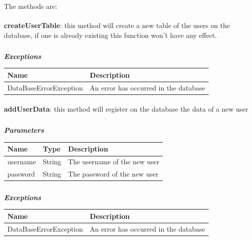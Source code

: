 						The methods are:
						
						\paragraph{}
							\textbf{createUserTable}: this method will create a new table of the users on the database, if one is already existing this function won't have any effect.
							\subparagraph{}
								\textit{\textbf{Exceptions}}
									\begin{table}[!h]
									\begin{tabular}{L{0.3\textwidth}L{0.3\textwidth}}
										\toprule
										Name & Description \\
										\midrule
								  		DataBaseErrorException & An error has occurred in the database \\ 
								 		\bottomrule
									\end{tabular}
								\end{table}
					
					\paragraph{}
							\textbf{addUserData}: this method will register on the database the data of a new user
							\subparagraph{}
							\textit{\textbf{Parameters}}
								\begin{table}[!h]
									\begin{tabular}{L{0.2\textwidth}L{0.2\textwidth}L{0.2\textwidth}}
										\toprule
										Name & Type & Description \\
										\midrule
								  		username & String & The username of the new user \\
								  		password & String & The password of the new user \\
								 		\bottomrule
									\end{tabular}
								\end{table}
							\subparagraph{}
								\textit{\textbf{Exceptions}}
									\begin{table}[!h]
									\begin{tabular}{L{0.3\textwidth}L{0.3\textwidth}}
										\toprule
										Name & Description \\
										\midrule
								  		DataBaseErrorException & An error has occurred in the database \\ 
								 		\bottomrule
									\end{tabular}
								\end{table}
					
